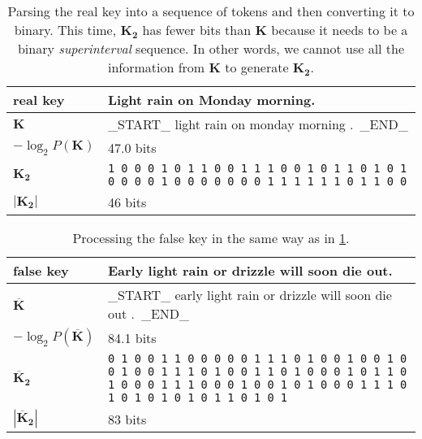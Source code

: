 \documentclass[draft]{IIBproject}
\begin{document}
\begin{table}[h]
	\centering
	\begin{tabular}{m{3cm} m{12cm}}
	\centering real key & Light rain on Monday morning. \\ \hline
	\centering $\mathbf K$ & \_START\_ light rain on monday morning .\ \_END\_ \\ \hline
	\centering $-\log_2 P(\mathbf K)$ & 47.0 bits \\ \hline
	\centering $\mathbf{K_2}$ & \footnotesize \texttt{1 0 0 0 1 0 1 1 0 0 1 1 1 0 0 1 0 1 1 0 1 0 1 0 0 0 0 1 0 0 0 0 0 0 0 1 1 1 1 1 1 0 1 1 0 0} \\ \hline
	\centering $| \mathbf{K_2} |$ & 46 bits
	\end{tabular}
	\caption{\label{tab:results_real_key}Parsing the real key into a sequence of tokens and then converting it to binary. This time, $\mathbf{K_2}$ has fewer bits than $\mathbf K$ because it needs to be a binary \emph{superinterval} sequence. In other words, we cannot use all the information from $\mathbf K$ to generate $\mathbf{K_2}$.}
\end{table}

\begin{table}[h]
	\centering
	\begin{tabular}{m{3cm} m{12cm}}
	\centering false key & Early light rain or drizzle will soon die out. \\ \hline
	\centering $\mathbf{\overline K}$ & \_START\_ early light rain or drizzle will soon die out .\ \_END\_ \\ \hline
	\centering $-\log_2 P(\mathbf{\overline K})$ & 84.1 bits \\ \hline
	\centering $\mathbf {\overline K_2}$ & \footnotesize \texttt{0 1 0 0 1 1 0 0 0 0 0 1 1 1 0 1 0 0 1 0 0 1 0 0 1 0 0 1 1 1 0 1 0 0 1 1 0 1 0 0 0 1 0 1 1 0 1 0 0 0 1 1 1 0 0 0 1 0 0 1 0 1 0 0 0 1 1 1 0 1 0 1 0 1 0 1 0 1 1 0 1 0 1} \\ \hline
	\centering $|\mathbf {\overline K_2}|$ & 83 bits
	\end{tabular}
	\caption{\label{tab:results_false_key}Processing the false key in the same way as in \cref{tab:results_real_key}.}
\end{table}
\end{document}

